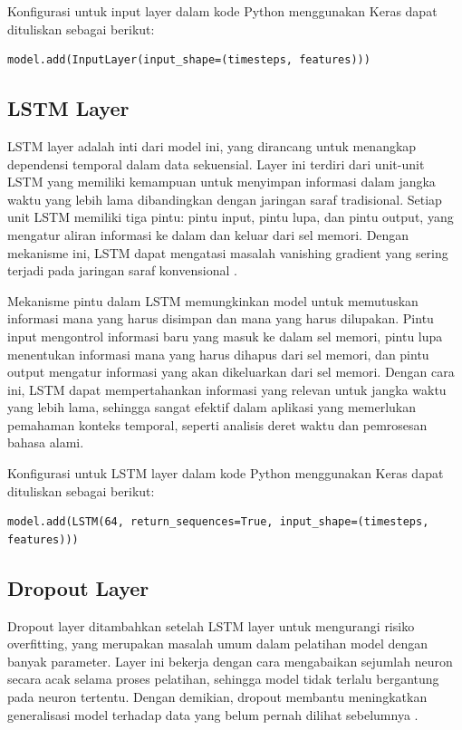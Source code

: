 \par Konfigurasi untuk input layer dalam kode Python menggunakan Keras dapat dituliskan sebagai berikut:
\begin{minipage}{\textwidth}
\begin{verbatim}
model.add(InputLayer(input_shape=(timesteps, features)))
\end{verbatim}
\end{minipage}

\subsection{LSTM Layer}
\par LSTM layer adalah inti dari model ini, yang dirancang untuk menangkap dependensi temporal dalam data sekuensial. Layer ini terdiri dari unit-unit LSTM yang memiliki kemampuan untuk menyimpan informasi dalam jangka waktu yang lebih lama dibandingkan dengan jaringan saraf tradisional. Setiap unit LSTM memiliki tiga pintu: pintu input, pintu lupa, dan pintu output, yang mengatur aliran informasi ke dalam dan keluar dari sel memori. Dengan mekanisme ini, LSTM dapat mengatasi masalah vanishing gradient yang sering terjadi pada jaringan saraf konvensional \cite{graves2013}.

\par Mekanisme pintu dalam LSTM memungkinkan model untuk memutuskan informasi mana yang harus disimpan dan mana yang harus dilupakan. Pintu input mengontrol informasi baru yang masuk ke dalam sel memori, pintu lupa menentukan informasi mana yang harus dihapus dari sel memori, dan pintu output mengatur informasi yang akan dikeluarkan dari sel memori. Dengan cara ini, LSTM dapat mempertahankan informasi yang relevan untuk jangka waktu yang lebih lama, sehingga sangat efektif dalam aplikasi yang memerlukan pemahaman konteks temporal, seperti analisis deret waktu dan pemrosesan bahasa alami.

\par Konfigurasi untuk LSTM layer dalam kode Python menggunakan Keras dapat dituliskan sebagai berikut:
\begin{minipage}{\textwidth}
\begin{verbatim}
model.add(LSTM(64, return_sequences=True, input_shape=(timesteps, features)))
\end{verbatim}
\end{minipage}

\subsection{Dropout Layer}
\par Dropout layer ditambahkan setelah LSTM layer untuk mengurangi risiko overfitting, yang merupakan masalah umum dalam pelatihan model dengan banyak parameter. Layer ini bekerja dengan cara mengabaikan sejumlah neuron secara acak selama proses pelatihan, sehingga model tidak terlalu bergantung pada neuron tertentu. Dengan demikian, dropout membantu meningkatkan generalisasi model terhadap data yang belum pernah dilihat sebelumnya \cite{bengio2012}.

